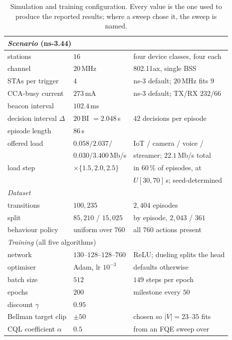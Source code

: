 \begin{table}[t]
\centering
\caption{Simulation and training configuration. Every value is the one used to
produce the reported results; where a sweep chose it, the sweep is named.}
\label{tab:config}
\footnotesize
\setlength{\tabcolsep}{3pt}
\begin{tabular}{lll}
\toprule
\multicolumn{3}{l}{\emph{Scenario} (ns-3.44)} \\
\midrule
stations & $16$ & four device classes, four each \\
channel & $20$\,MHz & 802.11ax, single BSS \\
STAs per trigger & $4$ & ns-3 default; $20$\,MHz fits $9$ \\
CCA-busy current & $273$\,mA & ns-3 default; TX/RX $232/66$ \\
beacon interval & $102.4$\,ms & \\
decision interval $\Delta$ & $20$\,BI $=2.048$\,s & $42$ decisions per episode \\
episode length & $86$\,s & \\
offered load & $0.058/2.037/$ & IoT / camera / voice / \\
 & $0.030/3.400$\,Mb/s & streamer; $22.1$\,Mb/s total \\
load step & $\times\{1.5,2.0,2.5\}$ & in $60\,\%$ of episodes, at \\
 & & $U[30,70]$\,s; seed-determined \\
\midrule
\multicolumn{3}{l}{\emph{Dataset}} \\
\midrule
transitions & $100{,}235$ & $2{,}404$ episodes \\
split & $85{,}210$ / $15{,}025$ & by episode, $2{,}043$ / $361$ \\
behaviour policy & uniform over $760$ & all $760$ actions present \\
\midrule
\multicolumn{3}{l}{\emph{Training} (all five algorithms)} \\
\midrule
network & $130$--$128$--$128$--$760$ & ReLU; dueling splits the head \\
optimiser & Adam, lr $10^{-3}$ & defaults otherwise \\
batch size & $512$ & $149$ steps per epoch \\
epochs & $200$ & milestone every $50$ \\
discount $\gamma$ & $0.95$ & \\
Bellman target clip & $\pm 50$ & chosen so $|V| = 23$--$35$ fits \\
CQL coefficient $\alpha$ & $0.5$ & from an FQE sweep over \\

\end{tabular}
\end{table}
